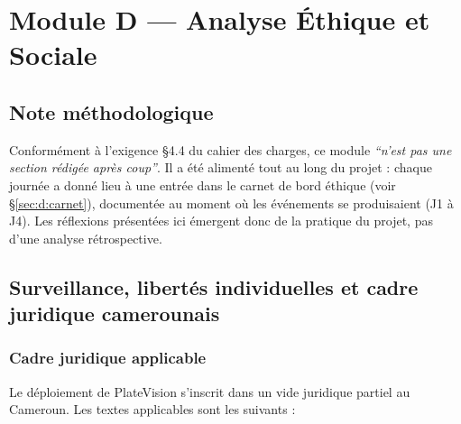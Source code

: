 
\chapter{Module D --- Analyse \'{E}thique et Sociale}
\label{chap:module_d}

\section*{Note m\'{e}thodologique}

Conform\'{e}ment \`{a} l'exigence §4.4 du cahier des charges, ce module
\textit{``n'est pas une section r\'{e}dig\'{e}e apr\`{e}s coup''}. Il a
\'{e}t\'{e} aliment\'{e} tout au long du projet : chaque journ\'{e}e a
donn\'{e} lieu \`{a} une entr\'{e}e dans le carnet de bord \'{e}thique
(voir §\ref{sec:d:carnet}), document\'{e}e au moment o\`{u} les
\'{e}v\'{e}nements se produisaient (J1 \`{a} J4). Les r\'{e}flexions
pr\'{e}sent\'{e}es ici \'{e}mergent donc de la pratique du projet, pas
d'une analyse r\'{e}trospective.

\section{Surveillance, libert\'{e}s individuelles et cadre juridique camerounais}
\label{sec:d:juridique}

\subsection{Cadre juridique applicable}
\label{sec:d:cadre_juridique}

Le d\'{e}ploiement de PlateVision s'inscrit dans un vide juridique partiel
au Cameroun. Les textes applicables sont les suivants :

